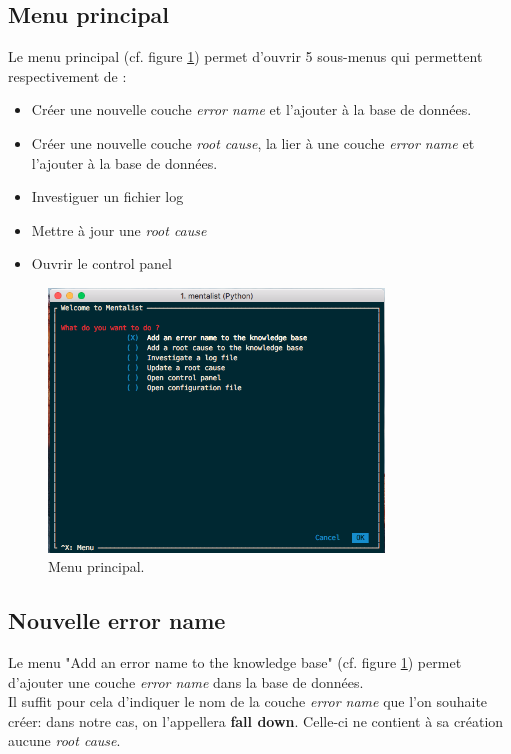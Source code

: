 \subsection{Menu principal}
\label{Industrialisation du produit: Utilisation suggérée des outils: Menu principal}
Le menu principal (cf. figure \ref{fig:Menu principal}) permet d'ouvrir 5 sous-menus qui permettent respectivement de :
\begin{itemize}
	\item Créer une nouvelle couche \emph{error name} et l'ajouter à la base de données.
	\item Créer une nouvelle couche \emph{root cause}, la lier à une couche \emph{error name} et l'ajouter à la base de données.
	\item Investiguer un fichier log
	\item Mettre à jour une \emph{root cause}
	\item Ouvrir le control panel
\end{itemize}

\begin{figure}[H]
	\centering\includegraphics[height=7cm]{images/main_menu.png}
	\caption[Menu principal]{Menu principal.}
	\label{fig:Menu principal}
\end{figure} 

\subsection{Nouvelle error name}
\label{Industrialisation du produit: Utilisation suggérée des outils: Nouvelle error name}
Le menu "Add an error name to the knowledge base" (cf. figure \ref{fig:Menu principal}) permet d'ajouter une couche \emph{error name} dans la base de données. \\
Il suffit pour cela d'indiquer le nom de la couche \emph{error name} que l'on souhaite créer: dans notre cas, on l'appellera \textbf{fall down}. Celle-ci ne contient à sa création aucune \emph{root cause}.

